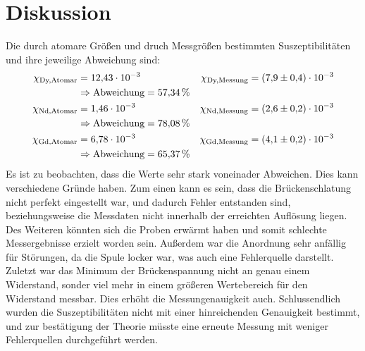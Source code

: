 \section{Diskussion}
\label{sec:Diskussion}
Die durch atomare Größen und druch Messgrößen bestimmten Suszeptibilitäten und ihre jeweilige Abweichung sind:
\begin{align*}
  \chi_\text{Dy,Atomar} &= \num{12.43e-3} & \chi_\text{Dy,Messung} &= \num{7.9\pm0.4e-3} \\
    & \Rightarrow \text{Abweichung} = \SI{57.34}{\percent} \\
  \chi_\text{Nd,Atomar} &= \num{1.46e-3} & \chi_\text{Nd,Messung} &= \num{2.6\pm0.2e-3} \\
    & \Rightarrow \text{Abweichung} = \SI{78.08}{\percent} \\
  \chi_\text{Gd,Atomar} &= \num{6.78e-3} & \chi_\text{Gd,Messung} &= \num{4.1\pm0.2e-3} \\
    & \Rightarrow \text{Abweichung} = \SI{65.37}{\percent}
\end{align*}
Es ist zu beobachten, dass die Werte sehr stark voneinader Abweichen. Dies kann verschiedene Gründe haben.
Zum einen kann es sein, dass die Brückenschlatung nicht perfekt eingestellt war, und dadurch Fehler entstanden sind, beziehungsweise
die Messdaten nicht innerhalb der erreichten Auflösung liegen. Des Weiteren könnten sich die Proben erwärmt haben und somit schlechte
Messergebnisse erzielt worden sein. Außerdem war die Anordnung sehr anfällig für Störungen, da die Spule locker war, was auch eine
Fehlerquelle darstellt. Zuletzt war das Minimum der Brückenspannung nicht an genau einem Widerstand, sonder viel mehr in einem größeren
Wertebereich für den Widerstand messbar. Dies erhöht die Messungenauigkeit auch. Schlussendlich wurden die Suszeptibilitäten nicht
mit einer hinreichenden Genauigkeit bestimmt, und zur bestätigung der Theorie müsste eine erneute Messung mit weniger Fehlerquellen
durchgeführt werden.
